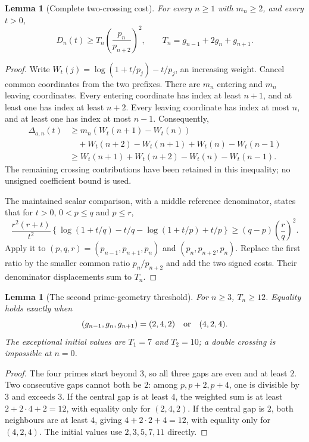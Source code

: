 \documentclass[11pt]{article}
\newtheorem{lemma}[theorem]{Lemma}
\theoremstyle{definition}
\begin{document}
\begin{lemma}[Complete two-crossing cost]
For every $n\ge1$ with $m_n\ge2$, and every $t>0$,
\[
 D_n(t)\ge
 T_n\left(\frac{p_n}{p_{n+2}}\right)^2,
 \qquad
 T_n=g_{n-1}+2g_n+g_{n+1}.
\]
\end{lemma}
\begin{proof}
Write $W_t(j)=\log(1+t/p_j)-t/p_j$, an increasing weight.
Cancel common coordinates from the two prefixes. There are $m_n$
entering and $m_n$ leaving coordinates. Every entering coordinate
has index at least $n+1$, and at least one has index at least $n+2$.
Every leaving coordinate has index at most $n$, and at least one
has index at most $n-1$. Consequently,
\begin{align*}
 \Delta_{a,n}(t)
 &\ge m_n(W_t(n+1)-W_t(n))\\
 &\quad+W_t(n+2)-W_t(n+1)+W_t(n)-W_t(n-1)\\
 &\ge W_t(n+1)+W_t(n+2)-W_t(n)-W_t(n-1).
\end{align*}
The remaining crossing contributions have been retained in this
inequality; no unsigned coefficient bound is used.

The maintained scalar comparison, with a middle reference denominator,
states that for $t>0$, $0<p\le q$ and $p\le r$,
\[
 \frac{r^2(r+t)}{t^2}
 \left\{\log(1+t/q)-t/q-\log(1+t/p)+t/p\right\}
 \ge(q-p)\left(\frac r q\right)^2.
\]
Apply it to $(p,q,r)=(p_{n-1},p_{n+1},p_n)$ and
$(p_n,p_{n+2},p_n)$. Replace the first ratio by the smaller common
ratio $p_n/p_{n+2}$ and add the two signed costs. Their denominator
displacements sum to $T_n$.
\end{proof}

\begin{lemma}[The second prime-geometry threshold]
For $n\ge3$, $T_n\ge12$. Equality holds exactly when
\[
 (g_{n-1},g_n,g_{n+1})=(2,4,2)\quad\hbox{or}\quad(4,2,4).
\]
The exceptional initial values are $T_1=7$ and $T_2=10$; a
double crossing is impossible at $n=0$.
\end{lemma}
\begin{proof}
The four primes start beyond $3$, so all three gaps are even and
at least $2$. Two consecutive gaps cannot both be $2$: among
$p,p+2,p+4$, one is divisible by $3$ and exceeds $3$.
If the central gap is at least $4$, the weighted sum is at least
$2+2\cdot4+2=12$, with equality only for $(2,4,2)$.
If the central gap is $2$, both neighbours are at least $4$,
giving $4+2\cdot2+4=12$, with equality only for $(4,2,4)$.
The initial values use $2,3,5,7,11$ directly.
\end{proof}
\end{document}

